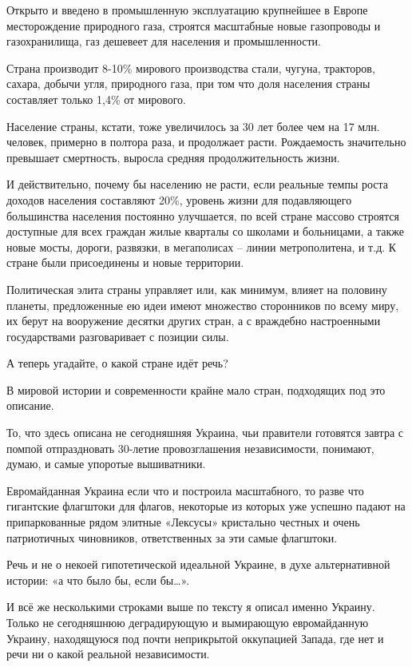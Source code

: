 Открыто и введено в промышленную эксплуатацию крупнейшее в Европе месторождение
природного газа, строятся масштабные новые газопроводы и газохранилища, газ
дешевеет для населения и промышленности.

Страна производит 8-10\% мирового производства стали, чугуна, тракторов, сахара,
добычи угля, природного газа, при том что доля населения страны составляет
только 1,4\% от мирового.

Население страны, кстати, тоже увеличилось за 30 лет более чем на 17 млн.
человек, примерно в полтора раза, и продолжает расти. Рождаемость значительно
превышает смертность, выросла средняя продолжительность жизни. 

И действительно, почему бы населению не расти, если реальные темпы роста
доходов населения составляют 20\%, уровень жизни для подавляющего большинства
населения постоянно улучшается, по всей стране массово строятся доступные для
всех граждан жилые кварталы со школами и больницами, а также новые мосты,
дороги, развязки, в мегаполисах – линии метрополитена, и т.д. К стране были
присоединены и новые территории.

Политическая элита страны управляет или, как минимум, влияет на половину
планеты, предложенные ею идеи имеют множество сторонников по всему миру, их
берут на вооружение десятки других стран, а с враждебно настроенными
государствами разговаривает с позиции силы. 

А теперь угадайте, о какой стране идёт речь? 

В мировой истории и современности крайне мало стран, подходящих под это описание.

То, что здесь описана не сегодняшняя Украина, чьи правители готовятся завтра с
помпой отпраздновать 30-летие провозглашения независимости, понимают, думаю, и
самые упоротые вышиватники. 

Евромайданная Украина если что и построила масштабного, то разве что гигантские
флагштоки для флагов, некоторые из которых уже успешно падают на припаркованные
рядом элитные «Лексусы» кристально честных и очень патриотичных чиновников,
ответственных за эти самые флагштоки.

Речь и не о некоей гипотетической идеальной Украине, в духе альтернативной
истории: «а что было бы, если бы…».

И всё же несколькими строками выше по тексту я описал именно Украину. Только не
сегодняшнюю деградирующую и вымирающую евромайданную Украину, находящуюся под
почти неприкрытой оккупацией Запада, где нет и речи ни о какой реальной
независимости. 

